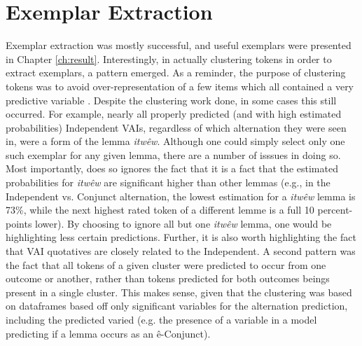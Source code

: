 \section{Exemplar Extraction}
Exemplar extraction was mostly successful, and useful exemplars were presented in Chapter \ref{ch:result}. Interestingly, in actually clustering tokens in order to extract exemplars, a pattern emerged. As a reminder, the purpose of clustering tokens was to avoid over-representation of a few items which all contained a very predictive variable . Despite the clustering work done, in some cases this still occurred. For example, nearly all properly predicted (and with high estimated probabilities) Independent VAIs, regardless of which alternation they were seen in, were a form of the lemma \textit{itwêw}. Although one could simply select only one such exemplar for any given lemma,  there are a number of isssues in doing so. Most importantly, does so ignores the fact that it is a fact that the estimated probabilities for \textit{itwêw} are significant higher than other lemmas (e.g., in the Independent vs. Conjunct alternation, the lowest estimation for a \textit{itwêw} lemma is 73\%, while the next highest rated token of a different lemme is a full 10 percent-points lower). By choosing to ignore all but one \textit{itwêw} lemma, one would  be highlighting less certain predictions. Further, it is also worth highlighting the fact that VAI quotatives are closely related to the Independent. A second pattern was the fact that all tokens of a given cluster were predicted to occur from one outcome or another, rather than tokens predicted for both outcomes beings present in a single cluster. This makes sense, given that the clustering was based on dataframes based off only significant variables for the alternation prediction, including the predicted varied (e.g. the presence of a  variable in a model predicting if a lemma occurs as an ê-Conjunct).